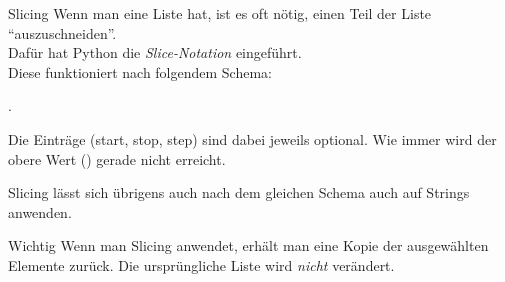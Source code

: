 \begin{frame}
\begin{block}{Slicing}
\vspace{2pt}
Wenn man eine Liste hat, ist es oft nötig, einen Teil der Liste \enquote{auszuschneiden}.\\
\pause
Dafür hat Python die \emph{Slice-Notation} eingeführt. \\
\pause 
Diese funktioniert nach folgendem Schema: 

\pause  {}. 

\pause 
Die Einträge (start, stop, step) sind dabei jeweils optional. Wie immer wird der obere Wert () gerade nicht erreicht.  
\pause 


Slicing lässt sich übrigens auch nach dem gleichen Schema auch auf Strings anwenden. 
\end{block}	

\pause
\vspace{12pt}

\begin{alertblock}{Wichtig}
\vspace{2pt}
Wenn man Slicing anwendet, erhält man eine Kopie der ausgewählten Elemente zurück. Die ursprüngliche Liste wird \emph{nicht} verändert. 
\end{alertblock}
\end{frame}


